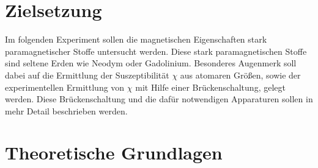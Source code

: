 \section{Zielsetzung}
Im folgenden Experiment sollen die magnetischen Eigenschaften stark paramagnetischer Stoffe untersucht werden. Diese stark paramagnetischen Stoffe sind seltene Erden wie Neodym oder Gadolinium. Besonderes Augenmerk soll dabei auf die Ermittlung der Suszeptibilität $\chi$ aus atomaren Größen, sowie der experimentellen Ermittlung von $\chi$ mit Hilfe einer Brückenschaltung, gelegt werden. Diese Brückenschaltung und die dafür notwendigen Apparaturen sollen in mehr Detail beschrieben werden.
\section{Theoretische Grundlagen}
